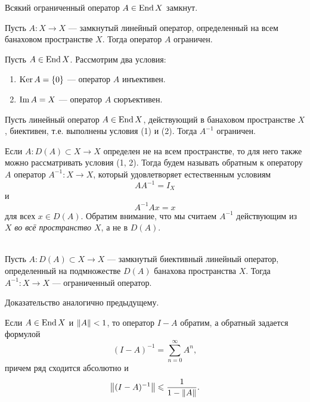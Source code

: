 \begin{theorem}
    Всякий ограниченный оператор $A \in \operatorname{End} X$ замкнут.
\end{theorem}

\begin{theorem}
    \indent Пусть $A \colon X \to X$ --- замкнутый линейный оператор, определенный на всем
    банаховом пространстве $X$. Тогда оператор $A$ ограничен.
\end{theorem}

Пусть $A \in \operatorname{End} X$. Рассмотрим два условия:
\begin{enumerate}
    \item $\operatorname{Ker} A = \left\{0\right\}$ --- оператор $A$ инъективен.
    \item $\operatorname{Im} A = X$ --- оператор $A$ сюръективен.
\end{enumerate}

\begin{theorem}
    \indent Пусть линейный оператор $A \in \operatorname{End} X$, действующий в банаховом пространстве $X$, 
    биективен, т.е. выполнены условия (1) и (2). Тогда $A^{-1}$ ограничен.
\end{theorem}

Если $A \colon D(A) \subset X \to X$ определен не на всем пространстве, то для него также можно 
рассматривать условия (1, 2). Тогда будем называть обратным к оператору $A$ оператор 
$A^{-1} \colon X \to X$, который удовлетворяет естественным условиям
\[ AA^{-1} = I_X \]
и
\[ A^{-1}Ax = x \]
для всех $x \in D(A)$. 
Обратим внимание, что мы считаем $A^{-1}$ действующим из $X$ \emph{во всё пространство $X$}, 
а не в $D(A)$.

\begin{theorem}\hfill\\
    \indent Пусть $A \colon D(A) \subset X \to X$ --- замкнутый биективный линейный оператор, 
    определенный на подмножестве $D(A)$ банахова пространства $X$. Тогда $A^{-1} \colon X \to X$ 
    --- ограниченный оператор. 
\end{theorem}

Доказательство аналогично предыдущему.

\begin{lemma}\label{le:neumann}
    Если $A \in \operatorname{End} X$ и $\left\|A\right\| < 1$, то оператор $I - A$ обратим, а обратный задается формулой
    \[ (I - A)^{-1} = \sum_{n = 0}^\infty A^n, \]
    причем ряд сходится абсолютно и
    \[ \left\|(I-A)^{-1}\right\| \leqslant \frac{1}{1-\left\|A\right\|}. \]
\end{lemma}

